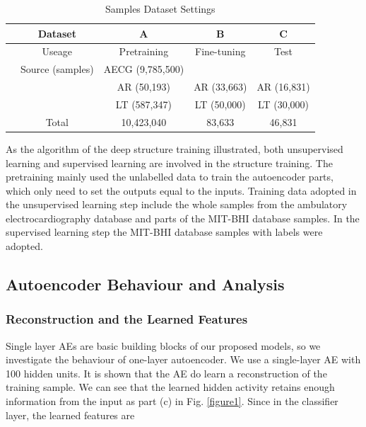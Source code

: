 \documentclass[journal]{IEEEtran}
\begin{document}
     
\begin{table}[!htbp]
\begin{center}
\begin{threeparttable}
\caption{Samples Dataset Settings}
\label{table3}
\begin{tabular}{ccccc}
\hline
& Dataset & A & B  &  C\\
\hline
& Useage  & Pretraining & Fine-tuning & Test \\
\hline
& Source (samples) & AECG (9,785,500)   &  &   \\
&  & AR (50,193)   & AR (33,663) & AR (16,831) \\
&  & LT (587,347)  & LT (50,000) & LT (30,000) \\
\hline
&Total & 10,423,040 & 83,633 & 46,831 \\
\hline
\end{tabular}
\end{threeparttable}
\end{center}
\end{table}

As the algorithm of the deep structure training illustrated, both unsupervised learning and supervised learning are involved in the structure training. The pretraining mainly used the unlabelled data to train the autoencoder parts, which only need to set the outputs equal to the inputs. Training data adopted in the unsupervised learning step include the whole samples from the  ambulatory electrocardiography database and parts of the MIT-BHI database samples. In the supervised learning step the MIT-BHI database samples with labels were adopted.


\subsection{Autoencoder Behaviour and Analysis}
\subsubsection{Reconstruction and the Learned Features}
Single layer AEs are basic building blocks of our proposed models, so we investigate the behaviour of one-layer autoencoder. We use a single-layer AE with 100 hidden units. It is shown that the AE do learn a reconstruction of the training sample. We can see that the learned hidden activity retains enough information from the input as part (c) in Fig. \ref{figure1}. Since in the classifier layer, the learned features are 
\end{document}
